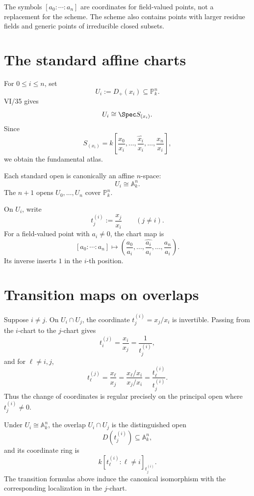 \begin{remark}
The symbols \([a_0:\cdots:a_n]\) are coordinates for field-valued points, not a replacement for the scheme.  The scheme also contains points with larger residue fields and generic points of irreducible closed subsets.
\end{remark}

\section{The standard affine charts}
For \(0\le i\le n\), set
\[
U_i:=D_+(x_i)\subseteq\mathbb P^n_k.
\]
VI/35 gives
\[
U_i\cong\Spec S_{(x_i)}.
\]
Since
\[
S_{(x_i)}=k\!\left[\frac{x_0}{x_i},\ldots,\widehat{\frac{x_i}{x_i}},\ldots,\frac{x_n}{x_i}\right],
\]
we obtain the fundamental atlas.

\begin{theorem}\label{thm:vi36-standard-atlas}
Each standard open is canonically an affine \(n\)-space:
\[
\boxed{U_i\cong\mathbb A^n_k.}
\]
The \(n+1\) opens \(U_0,\ldots,U_n\) cover \(\mathbb P^n_k\).
\end{theorem}

On \(U_i\), write
\[
t_j^{(i)}:=\frac{x_j}{x_i}\qquad(j\ne i).
\]
For a field-valued point with \(a_i\ne0\), the chart map is
\[
[a_0:\cdots:a_n]\longmapsto
\left(\frac{a_0}{a_i},\ldots,\widehat{\frac{a_i}{a_i}},\ldots,\frac{a_n}{a_i}\right).
\]
Its inverse inserts \(1\) in the \(i\)-th position.



\section{Transition maps on overlaps}
Suppose \(i\ne j\).  On \(U_i\cap U_j\), the coordinate \(t_j^{(i)}=x_j/x_i\) is invertible.  Passing from the \(i\)-chart to the \(j\)-chart gives
\[
t_i^{(j)}=\frac{x_i}{x_j}=\frac{1}{t_j^{(i)}},
\]
and for \(\ell\ne i,j\),
\[
t_\ell^{(j)}=\frac{x_\ell}{x_j}
=\frac{x_\ell/x_i}{x_j/x_i}
=\frac{t_\ell^{(i)}}{t_j^{(i)}}.
\]
Thus the change of coordinates is regular precisely on the principal open where \(t_j^{(i)}\ne0\).

\begin{proposition}
Under \(U_i\cong\mathbb A^n_k\), the overlap \(U_i\cap U_j\) is the distinguished open
\[
D(t_j^{(i)})\subseteq\mathbb A^n_k,
\]
and its coordinate ring is
\[
k[t_\ell^{(i)}:\ell\ne i]_{t_j^{(i)}}.
\]
The transition formulas above induce the canonical isomorphism with the corresponding localization in the \(j\)-chart.
\end{proposition}

